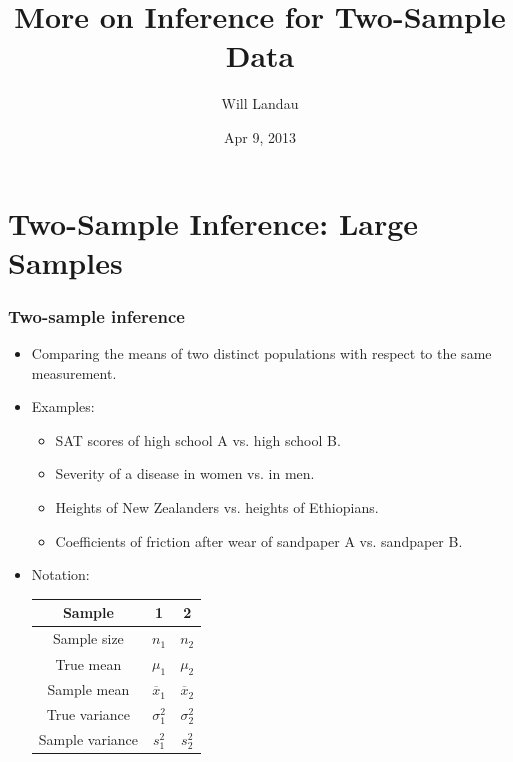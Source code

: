 \documentclass[handout]{beamer}\usepackage{graphicx, color}
\title{More on Inference for Two-Sample Data}
\author{Will Landau}
\date{Apr 9, 2013}
\institute{Iowa State University}
\providecommand{\ov}[1]{\overline{#1}}
\numberwithin{equation}{section}
\begin{document}
\begin{frame}
\titlepage
 \end{frame}
 



\section{Two-Sample Inference: Large Samples}

\begin{frame}
\frametitle{Two-sample inference}
\begin{itemize}
\item Comparing the means of two distinct populations with respect to the same measurement.
\pause \item Examples:
\begin{itemize}
\item SAT scores of high school A vs. high school B.
\pause \item Severity of a disease in women vs. in men. 
\pause \item Heights of New Zealanders vs. heights of Ethiopians.
\pause \item Coefficients of friction after wear of sandpaper A vs. sandpaper B.
\end{itemize}
\pause \item Notation:
\begin{center}
\begin{tabular}{ccc}
Sample & 1 & 2 \\ \hline
Sample size & $n_1$ & $n_2$ \\ [1ex]
True mean & $\mu_1$ & $\mu_2$ \\ [1ex] 
Sample mean & $\ov{x}_1$ & $\ov{x}_2$ \\ [1ex]
True variance & $\sigma^2_1$ & $\sigma^2_2$ \\ [1ex]
Sample variance & $s^2_1$ & $s^2_2$ 
\end{tabular}
\end{center}

\end{itemize}
\end{frame}
\end{document}
